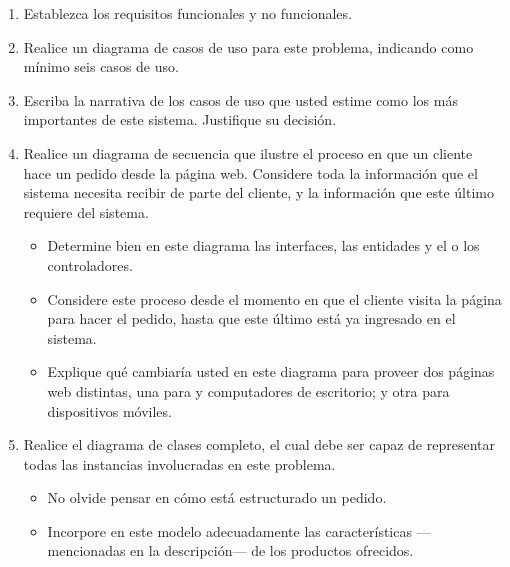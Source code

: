 \documentclass[11pt,letterpaper]{article}
\begin{document}
\begin{spacing}{1.2}
\begin{Problem}
    \begin{enumerate}
        \item Establezca los requisitos funcionales y no funcionales.
        \item Realice un diagrama de casos de uso para este problema, indicando como mínimo seis
            casos de uso.
        \item Escriba la narrativa de los  casos de uso que usted estime como los más
            importantes de este sistema. Justifique su decisión.
        \item Realice un diagrama de secuencia que ilustre el proceso en que un cliente
            hace un pedido desde la página web. Considere toda la información que el sistema necesita
            recibir de parte del cliente, y la información que este último requiere del sistema.
        \begin{itemize}
            \item Determine bien en este diagrama las interfaces, las entidades y el o los controladores.
            \item Considere este proceso desde el momento en que el cliente visita la página para hacer
                el pedido, hasta que este último está ya ingresado en el sistema.
            \item Explique qué cambiaría usted en este diagrama para proveer dos páginas web distintas,
                una para  y computadores de escritorio; y otra para dispositivos móviles.
        \end{itemize}
        \item Realice el diagrama de clases completo, el cual debe ser capaz de representar todas
            las instancias involucradas en este problema.
        \begin{itemize}
            \item No olvide pensar en cómo está estructurado un pedido.
            \item Incorpore en este modelo adecuadamente las características ---mencionadas en la descripción--- de los productos ofrecidos.
        \end{itemize}
    \end{enumerate}

\end{Problem}


\end{spacing}
\end{document}
